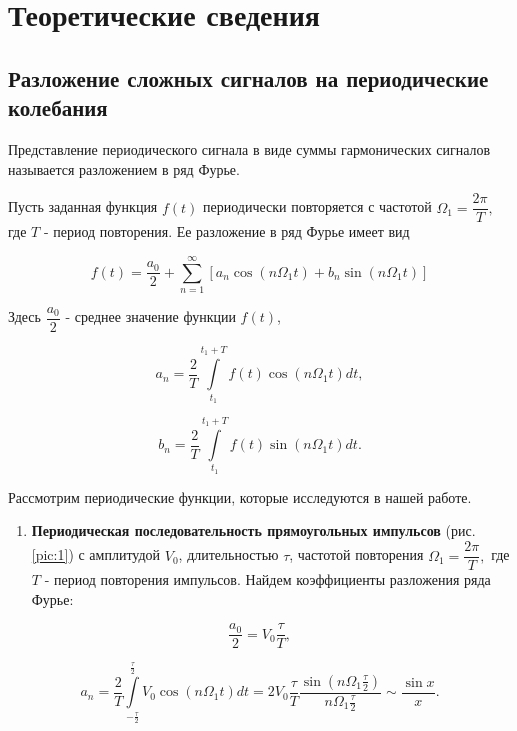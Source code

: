 \documentclass[a4paper,12pt]{article}
\begin{document}
\section{Теоретические сведения}


\subsection*{Разложение сложных сигналов на периодические колебания}
Представление периодического сигнала в виде суммы гармонических сигналов называется разложением в ряд Фурье.

Пусть заданная функция $f(t)$ периодически повторяется с частотой $\Omega_{1}=\dfrac{2\pi}{T},$ где $T$ - период повторения. Ее разложение в ряд Фурье имеет вид

\begin{equation}\label{eq:1}
    f(t)=\dfrac{a_{0}}{2}+ \sum\limits_{n=1}^\infty [a_{n}\cos(n \Omega_{1}t)+b_{n}\sin(n \Omega_{1} t) ]
\end{equation}

Здесь $\dfrac{a_{0}}{2}$ - среднее значение функции $f(t)$,

\begin{equation}\label{eq:2}
     a_{n}=\dfrac{2}{T}\int\limits_{t_{1}}^{t_{1}+T}f(t)\cos(n \Omega_{1} t)dt, 
\end{equation}

\begin{equation}\label{eq:3}
    b_{n}=\dfrac{2}{T}\int\limits_{t_{1}}^{t_{1}+T}f(t)\sin(n \Omega_{1} t)dt.
\end{equation}


Рассмотрим периодические функции, которые исследуются в нашей работе.

\begin{enumerate}
    \item \textbf{Периодическая последовательность прямоугольных импульсов} (рис. \ref{pic:1}) с амплитудой $V_{0}$, длительностью $\tau$, частотой повторения $\Omega_{1}=\dfrac{2\pi}{T},$ где $T$ - период повторения импульсов. Найдем коэффициенты разложения ряда Фурье:
\end{enumerate}

\begin{equation*}
    \dfrac{a_{0}}{2}=V_{0}\dfrac{\tau}{T},
\end{equation*}

\begin{equation}\label{eq:4}
    a_{n}=\dfrac{2}{T}\int\limits_{-\frac{\tau}{2}}^{\frac{\tau}{2}}V_{0}\cos(n \Omega_{1} t)dt=2V_{0}\dfrac{\tau}{T}\dfrac{\sin(n \Omega_{1} \frac{\tau}{2})}{n\Omega_{1}\frac{\tau}{2}} \sim \dfrac{\sin x}{x}.
\end{equation}
\end{document}
